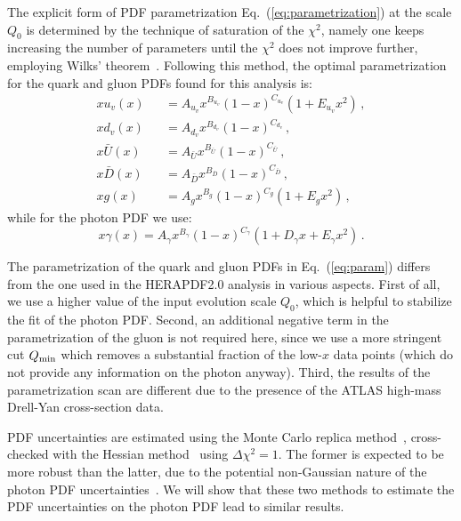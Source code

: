 The explicit form of PDF parametrization Eq.~(\ref{eq:parametrization})
at the scale $Q_0$ is determined by the
technique of saturation of the $\chi^{2}$, namely one keeps increasing
the number of parameters until the $\chi^{2}$ does not improve
further, employing Wilks' theorem~\cite{Wilks:1938dza}.
%
Following this method, the optimal parametrization for the quark and
gluon PDFs found for this analysis is:
\begin{eqnarray}
  \nonumber
  xu_v(x) &&= A_{u_v}x^{B_{u_v}}(1-x)^{C_{u_v}}(1+E_{u_v}x^{2})\, , \\
  \nonumber
xd_v(x) &&= A_{d_v}x^{B_{d_v}}(1-x)^{C_{d_v}}\, , \\
x\bar{U}(x) &&= A_{\bar{U}}x^{B_{\bar{U}}}(1-x)^{C_{\bar{U}}}\, , \\
\nonumber
x\bar{D}(x) &&= A_{\bar{D}}x^{B_{\bar{D}}}(1-x)^{C_{\bar{D}}}\, , \\
\nonumber
\label{eq:param}
xg(x) &&= A_{g}x^{B_{g}}(1-x)^{C_{g}}(1+E_{g}x^{2})\, ,
\end{eqnarray}
while for the photon PDF we use:
\begin{equation}
x\gamma(x) = A_{\gamma}x^{B_{\gamma}}(1-x)^{C_{\gamma}}(1+D_{\gamma}x+E_{\gamma}x^{2}) \, .
\end{equation}


The parametrization of the quark and gluon PDFs in
Eq.~(\ref{eq:param}) differs from the one used in the HERAPDF2.0
analysis in various aspects.
%
First of all, we use a higher value of the input evolution scale
$Q_0$, which is helpful to stabilize the fit of the photon PDF.
%
Second, an additional negative term in the parametrization of the
gluon is not required here, since we use a more stringent cut
$Q_{\rm min}$ which removes a substantial fraction of the low-$x$ data points (which do
not provide any information on the photon anyway).
%
Third, the results of the parametrization scan are different due to
the presence of the ATLAS high-mass Drell-Yan cross-section data.

PDF uncertainties are estimated using the Monte Carlo replica
method~\cite{DelDebbio:2004xtd,DelDebbio:2007ee,Ball:2008by},
cross-checked with
the Hessian method~\cite{Pumplin:2001ct} using $\Delta\chi^2=1$.
%
The former is expected to be more robust than the latter, due to the
potential non-Gaussian nature of the photon PDF
uncertainties~\cite{Ball:2013hta}.
%
We will show that these two methods to estimate the PDF uncertainties
on the photon PDF lead to similar results.

